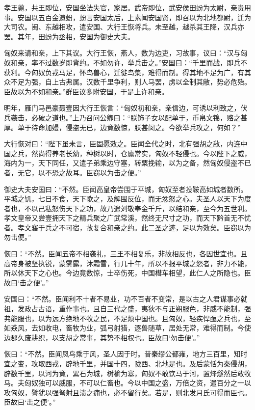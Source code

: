 \documentclass[]{article}
\begin{document}
孝王薨，共王即位，安国坐法失官，家居。武帝即位，武安侯田蚡为太尉，亲贵用事。安国以五百金遗蚡，蚡言安国太后，上素闻安国贤，即召以为北地都尉，迁为大司农。闽、东越相攻，遣安国、大行王恢将兵。未至越，越杀其王降，汉兵亦罢。其年，田蚡为丞相，安国为御史大夫。

匈奴来请和亲，上下其议。大行王恢，燕人，数为边吏，习故事，议曰：``汉与匈奴和亲，率不过数岁即背约。不如勿许，举兵击之。''安国曰：``千里而战，即兵不获利。今匈奴负戎马足，怀鸟兽心，迁徙鸟集，难得而制。得其地不足为广，有其众不足为强，自上古弗属。汉数千里争利，则人马罢，虏以全制其敝，势必危殆。臣故以为不如和亲。''群臣议多附安国，于是上许和亲。

明年，雁门马邑豪聂壹因大行王恢言：``匈奴初和亲，亲信边，可诱以利致之，伏兵袭击，必破之道也。''上乃召问公卿曰：``朕饰子女以配单于，币帛文锦，赂之甚厚。单于待命加嫚，侵盗无已，边竟数惊，朕甚闵之。今欲举兵攻之，何如？''

大行恢对曰：``陛下虽未言，臣固愿效之。臣闻全代之时，北有强胡之敌，内连中国之兵，然尚得养老长幼，种树以时，仓廪常实，匈奴不轻侵也。今以陛下之威，海内为一，天下同任，又遣子弟乘边守塞，转粟挽输，以为之备，然匈奴侵盗不已者，无它，以不恐之故耳。臣窃以为击之便。''

御史大夫安国曰：``不然。臣闻高皇帝尝围于平城，匈奴至者投鞍高如城者数所。平城之饥，七日不食，天下歌之，及解围反位，而无忿怒之心。夫圣人以天下为度者也，不以己私怒伤天下之功，故乃遣刘敬奉金千斤，以结和亲，至今为五世利。孝文皇帝又尝壹拥天下之精兵聚之广武常溪，然终无尺寸之功，而天下黔首无不忧者。孝文寤于兵之不可宿，故复合和亲之约。此二圣之迹，足以为效矣。臣窃以为勿击便。''

恢曰：``不然。臣闻五帝不相袭礼，三王不相复乐，非故相反也，各因世宜也。且高帝身被坚执锐，蒙雾露，沐霜雪，行几十年，所以不报平城之怨者，非力不能，所以休天下之心也。今边竟数惊，士卒伤死，中国槥车相望，此仁人之所隐也。臣故曰`击之便'。''

安国曰：``不然。臣闻利不十者不易业，功不百者不变常，是以古之人君谋事必就祖，发政占古语，重作事也。且自三代之盛，夷狄不与正朔服色，非威不能制，强弗能服也，以为远方绝地不牧之民，不足烦中国也。且匈奴，轻疾悍亟之兵也，至如猋风，去如收电，畜牧为业，弧弓射猎，逐兽随草，居处无常，难得而制。今使边郡久废耕织，以支胡之常事，其势不相权也。臣故曰`勿击便'。''

恢曰：``不然。臣闻凤鸟乘于风，圣人因于时。昔秦缪公都雍，地方三百里，知时宜之变，攻取西戎，辟地千里，并国十四，陇西、北地是也。及后蒙恬为秦侵胡，辟数千里，以河为竟，累石为城，树榆为塞，匈奴不敢饮马于河，置烽燧然后敢牧马。夫匈奴独可以威服，不可以仁畜也。今以中国之盛，万倍之资，遣百分之一以攻匈奴，譬犹以强弩射且溃之痈也，必不留行矣。若是，则北发月氏可得而臣也。臣故曰`击之便'。''
\end{document}
